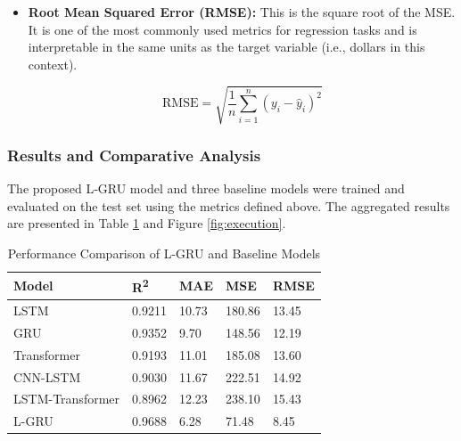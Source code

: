 \documentclass{cys}
\begin{document}
\begin{enumerate}
\begin{itemize}
        \item \textbf{Root Mean Squared Error (RMSE):}
        This is the square root of the MSE. It is one of the most commonly used metrics for regression tasks and is interpretable in the same units as the target variable (i.e., dollars in this context).

        \begin{equation*}
            \text{RMSE} = \sqrt{\frac{1}{n} \sum_{i=1}^{n} (y_i - \hat{y}_i)^2}
        \end{equation*}

    \end{itemize}

\subsubsection{Results and Comparative Analysis}
    
    The proposed L‑GRU model and three baseline models were trained and evaluated on the test set using the metrics defined above. The aggregated results are presented in Table \ref{tab:performance_comparison} and Figure \ref{fig:execution}.

    \begin{table}[h!]
    \centering
    \caption{Performance Comparison of L-GRU and Baseline Models}
    \begin{tabular}{|l|l|l|l|l|}
    \hline
    \textbf{Model} & \textbf{R\textsuperscript{2}} & \textbf{MAE} & \textbf{MSE} & \textbf{RMSE} \\ \hline
    LSTM        & 0.9211 & 10.73 & 180.86 & 13.45 \\ \hline
    GRU         & 0.9352 & 9.70  & 148.56 & 12.19 \\ \hline
    Transformer & 0.9193 & 11.01 & 185.08 & 13.60 \\ \hline
    CNN-LSTM & 0.9030 & 11.67 & 222.51 & 14.92 \\ \hline
    LSTM-Transformer & 0.8962 & 12.23 & 238.10 & 15.43 \\ \hline
    L-GRU       & 0.9688 & 6.28  & 71.48  & 8.45  \\ \hline
    \end{tabular}
    \label{tab:performance_comparison}
    \end{table}


\end{enumerate}
\end{document}

